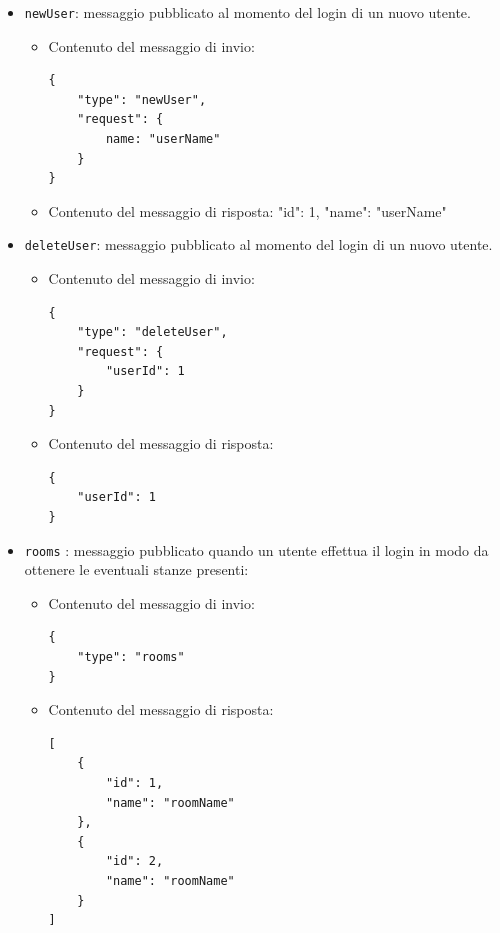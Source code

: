 \documentclass[a4paper]{article}
\begin{document}
\begin{itemize}

    \item \texttt{newUser}: messaggio pubblicato al momento del login di un nuovo utente.
        \begin{itemize}
            \item Contenuto del messaggio di invio:
            \begin{verbatim}
{
    "type": "newUser",
    "request": {
        name: "userName"
    } 
}
            \end{verbatim}
            \item Contenuto del messaggio di risposta:
{
    "id": 1,
    "name": "userName"
}         
        \end{itemize}

    \item \texttt{deleteUser}: messaggio pubblicato al momento del login di un nuovo utente.
        \begin{itemize}
            \item Contenuto del messaggio di invio:
            \begin{verbatim}
{
    "type": "deleteUser",
    "request": {
        "userId": 1 
    } 
}
            \end{verbatim}
            \item Contenuto del messaggio di risposta:
            \begin{verbatim}
{
    "userId": 1
}
            \end{verbatim}
        \end{itemize}

    \item \texttt{rooms} : messaggio pubblicato quando un utente effettua il login in modo da ottenere le eventuali stanze presenti:
        \begin{itemize}
            \item Contenuto del messaggio di invio:
            \begin{verbatim}
{
    "type": "rooms"
}
            \end{verbatim}
            \item Contenuto del messaggio di risposta:
            \begin{verbatim}
[
    {
        "id": 1,
        "name": "roomName"
    },
    {
        "id": 2,
        "name": "roomName"
    }
]
            \end{verbatim}
        \end{itemize}    


\end{itemize}
\end{document}
